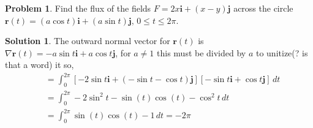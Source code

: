 \documentclass[10pt]{article}
\theoremstyle{definition}
\newtheorem{problem}{Problem}
\newtheorem{soln}{Solution}
\newcommand{\ui}{\mathbf{i}}
\newcommand{\uj}{\mathbf{j}}
\begin{document}
\begin{problem}
Find the flux of the fields $F = 2x\ui + (x - y)\uj$ across the circle $\mathbf{r}(t) =(a\cos t)\ui + (a\sin t)\uj,\,0\leq t \leq 2\pi$.
\end{problem}
\begin{soln}
  The outward normal vector for $\mathbf{r}(t)$ is $\nabla\mathbf{r}(t)=-a\sin t\ui+a\cos t\uj$, for $a\neq1$ this must be divided by
  $a$ to unitize(? is that a word) it so,
  \begin{align*}
     & =\int_0^{2\pi}\left[-2\sin t\ui + (-\sin t - \cos t)\uj\right]\left[-\sin t\ui+\cos t\uj\right]\,dt \\
     & =\int_0^{2\pi}-2\sin^2t-\sin (t)\cos (t) - \cos^2 t\,dt                                             \\
     & =\int_0^{2\pi}\sin (t)\cos (t) - 1\,dt=-2\pi
  \end{align*}
\end{soln}
\end{document}
